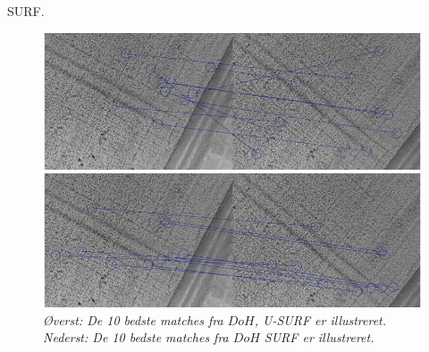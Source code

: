 SURF.
\begin{figure}[H]
    \centering
    \includegraphics[width=1\textwidth]{fig/rot2.png}
     \vspace{-1em}
    \begin{center} 
       \caption{{\footnotesize \textit{Øverst: De 10 bedste matches fra $DoH$, U-SURF er illustreret. Nederst: De 10 bedste matches fra $DoH$ SURF er illustreret. }}}
    \label{fig:rota}
     \end{center}
     \vspace{-2.5em}
  \end{figure} \noindent

